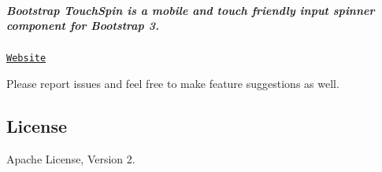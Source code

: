 \subparagraph*{Bootstrap Touch\+Spin is a mobile and touch friendly input spinner component for Bootstrap 3.}


\begin{DoxyItemize}
\item \href{http://www.virtuosoft.eu/code/bootstrap-touchspin/}{\tt Website}
\end{DoxyItemize}

Please report issues and feel free to make feature suggestions as well.

\subsection*{License}

Apache License, Version 2.

\href{http://githalytics.com/istvan-ujjmeszaros/bootstrap-touchspin}{\tt } 